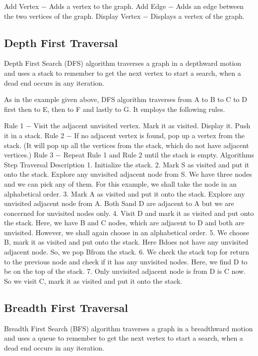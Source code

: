 Add Vertex − Adds a vertex to the graph.
Add Edge − Adds an edge between the two vertices of the graph.
Display Vertex − Displays a vertex of the graph.

\subsection{Depth First Traversal}

Depth First Search (DFS) algorithm traverses a graph in a depthward motion and uses a stack to remember to get the next vertex to start a search, when a dead end occurs in any iteration.



As in the example given above, DFS algorithm traverses from A to B to C to D first then to E, then to F and lastly to G. It employs the following rules.

Rule 1 − Visit the adjacent unvisited vertex. Mark it as visited. Display it. Push it in a stack.
Rule 2 − If no adjacent vertex is found, pop up a vertex from the stack. (It will pop up all the vertices from the stack, which do not have adjacent vertices.)
Rule 3 − Repeat Rule 1 and Rule 2 until the stack is empty.
Algorithms
Step	Traversal	Description
1.		Initialize the stack.
2.		Mark S as visited and put it onto the stack. Explore any unvisited adjacent node from S. We have three nodes and we can pick any of them. For this example, we shall take the node in an alphabetical order.
3.		Mark A as visited and put it onto the stack. Explore any unvisited adjacent node from A. Both Sand D are adjacent to A but we are concerned for unvisited nodes only.
4.		Visit D and mark it as visited and put onto the stack. Here, we have B and C nodes, which are adjacent to D and both are unvisited. However, we shall again choose in an alphabetical order.
5.		We choose B, mark it as visited and put onto the stack. Here Bdoes not have any unvisited adjacent node. So, we pop Bfrom the stack.
6.		We check the stack top for return to the previous node and check if it has any unvisited nodes. Here, we find D to be on the top of the stack.
7.		Only unvisited adjacent node is from D is C now. So we visit C, mark it as visited and put it onto the stack.

\subsection{Breadth First Traversal}

Breadth First Search (BFS) algorithm traverses a graph in a breadthward motion and uses a queue to remember to get the next vertex to start a search, when a dead end occurs in any iteration.



